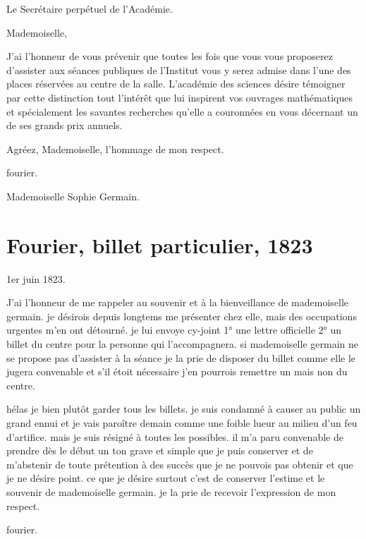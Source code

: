\documentclass[11pt,a4paper]{article}
\begin{document}
Le Secrétaire perpétuel de l'Académie.

Mademoiselle,

J'ai l'honneur de vous prévenir que toutes les fois que vous vous proposerez
d'assister aux séances publiques de l'Institut vous y serez admise dans l'une
des places réservées au centre de la salle. L'académie des sciences désire
témoigner par cette distinction tout l'intérêt que lui inspirent vos ouvrages
mathématiques et spécialement les savantes recherches qu'elle a couronnées en
vous décernant un de ses grands prix annuels.

Agréez, Mademoiselle, l'hommage de mon respect.

fourier.

Mademoiselle Sophie Germain.

\section{Fourier, billet particulier, 1823}


1er juin 1823.

J'ai l'honneur de me rappeler au souvenir et à la bienveillance de
mademoiselle germain. je désirois depuis longtems me présenter chez elle, mais
des occupations urgentes m'en ont détourné. je lui envoye cy-joint 1° une
lettre officielle 2° un billet du centre pour la personne qui l'accompagnera.
si mademoiselle germain ne se propose pas d'assister à la séance je la prie de
disposer du billet comme elle le jugera convenable et s'il étoit nécessaire
j'en pourrois remettre un  mais non du centre.

hélas je  bien plutôt garder tous les billets. je suis
condamné à causer au public un grand ennui et je vais paroître demain comme
une foible lueur au milieu d'un feu d'artifice. mais je suis résigné à toutes
les  possibles. il m'a paru convenable de prendre dès
le début un ton grave et simple que je puis conserver et de m'abstenir de
toute prétention à des succès que je ne pouvois pas obtenir et que je ne
désire point. ce que je désire surtout c'est de conserver l'estime et le
souvenir de mademoiselle germain. je la prie de recevoir l'expression de mon
respect.

fourier.
\end{document}
